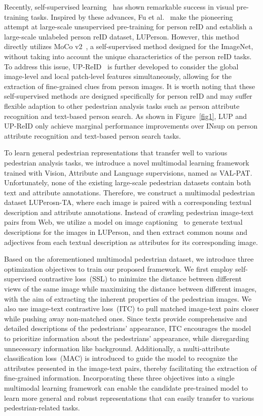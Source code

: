 \documentclass[final]{cvpr}
\begin{document}
Recently, self-supervised learning~\cite{he2020momentum,chen2020simple,he2022masked,bao2021beit} has shown remarkable success in visual pre-training tasks.
Inspired by these advances, Fu et al.~\cite{fu2021unsupervised} make the pioneering attempt at large-scale unsupervised pre-training for person reID and establish a large-scale unlabeled person reID dataset, LUPerson.
However, this method directly utilizes MoCo v2~\cite{chen2020improved}, a self-supervised method designed for the ImageNet, without taking into account the unique characteristics of the person reID tasks.
To address this issue, UP-ReID~\cite{yang2022unleashing} is further developed to consider the global image-level and local patch-level features simultaneously, allowing for the extraction of fine-grained clues from person images.
It is worth noting that these self-supervised methods are designed specifically for person reID and may suffer flexible adaption to other pedestrian analysis tasks such as person attribute recognition and text-based person search.
As shown in Figure~\ref{fig1}, LUP and UP-ReID only achieve marginal performance improvements over INsup on person attribute recognition and text-based person search tasks.


To learn general pedestrian representations that transfer well to various pedestrian analysis tasks, we introduce a novel multimodal learning framework trained with Vision, Attribute and Language supervisions, named as VAL-PAT.
Unfortunately, none of the existing large-scale pedestrian datasets contain both text and attribute annotations.
Therefore, we construct a multimodal pedestrian dataset LUPerosn-TA,
where each image is paired with a corresponding textual description and attribute annotations.
Instead of crawling pedestrian image-text pairs from Web, we utilize a model on image captioning~\cite{xu2015show} to generate textual descriptions for the images in LUPerson,
and then extract common nouns and adjectives from each textual description as attributes for its corresponding image.

Based on the aforementioned multimodal pedestrian dataset, we introduce three optimization objectives to train our proposed framework.
We first employ self-supervised contrastive loss~(SSL) to minimize the distance between different views of the same image while maximizing the distance between different images, with the aim of extracting the inherent properties of the pedestrian images.
We also use image-text contrastive loss~(ITC) to pull matched image-text pairs closer while pushing away non-matched ones.
Since texts provide comprehensive and detailed descriptions of the pedestrians' appearance, ITC encourages the model to prioritize information about the pedestrians' appearance, while disregarding unnecessary information like background.
Additionally, a multi-attribute classification loss~(MAC) is introduced to guide the model to recognize the attributes presented in the image-text pairs, thereby facilitating the extraction of fine-grained information.
Incorporating these three objectives into a single multimodal learning framework can enable the candidate pre-trained model to learn more general and robust representations that can easily transfer to various pedestrian-related tasks.
\end{document}
